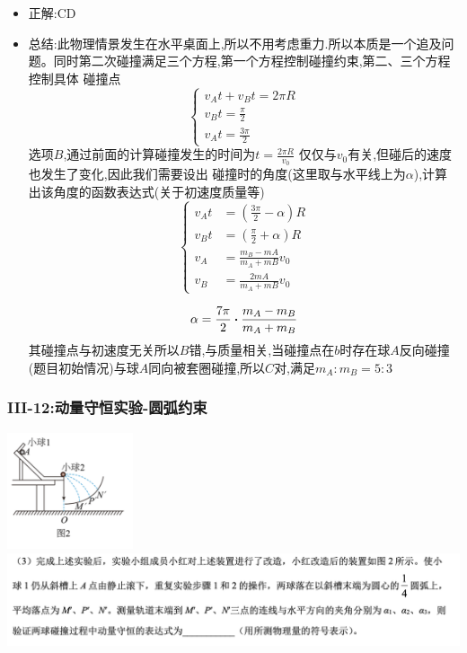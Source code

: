 \documentclass{article}
\begin{document}
\begin{itemize}
    \item 正解:\quad CD
    \item 总结:\quad 此物理情景发生在水平桌面上,所以不用考虑重力.所以本质是一个追及问题。同时第二次碰撞满足三个方程,第一个方程控制碰撞约束,第二、三个方程控制具体
          碰撞点
          $$
              \begin{cases}
                  v_{A} t + v_{B} t = 2 \pi R \\
                  v_{B} t  = \frac{\pi}{2}    \\
                  v_{A} t = \frac{3\pi}{2}
              \end{cases}
          $$
          选项$B$,通过前面的计算碰撞发生的时间为$t = \frac{2\pi R}{v_{0}}$ 仅仅与$v_{0}$有关,但碰后的速度也发生了变化,因此我们需要设出
          碰撞时的角度(这里取与水平线上为$\alpha$),计算出该角度的函数表达式(关于初速度质量等)
          $$
              \begin{cases}
                  v_{A} t & = (\frac{3\pi}{2} - \alpha) R           \\
                  v_{B} t & = (\frac{\pi}{2} + \alpha) R            \\
                  v_{A}   & = \frac{m_{B} - m{A}}{m_{A}+m{B}} v_{0} \\
                  v_{B}   & = \frac{2 m{A}}{m_{A}+m{B}} v_{0}
              \end{cases}
          $$

          $$
              \alpha = \frac{7 \pi}{2} \vdot \frac{m_{A} - m_{B}}{m_{A} + m_{B}}
          $$
          其碰撞点与初速度无关所以$B$错,与质量相关,当碰撞点在$b$时存在球$A$反向碰撞(题目初始情况)与球$A$同向被套圈碰撞,所以$C$对,满足$m_{A} : m_{B} = 5 : 3$
\end{itemize}

\vspace{2em}

\subsubsection{III-12:动量守恒实验-圆弧约束}
\includegraphics[width=10em,keepaspectratio]{./pictures/1.2-4.png}
\includegraphics[width=40em,keepaspectratio]{./pictures/1.2-5.png}
\end{document}
